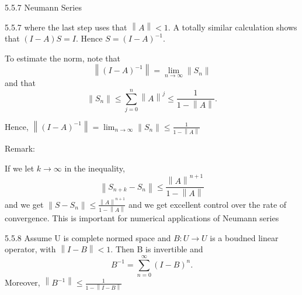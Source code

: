 \documentclass[a4paper,norsk]{article}
\renewcommand{\leq}{\leqslant}
\begin{document}
\begin{theorembox}{5.5.7 Neumann Series}{}
\begin{proofbox}{5.5.7}{}
        where the last step uses that $ \left\lVert A \right\rVert < 1 $. A totally similar calculation shows that $ \left( I-A \right) S = I $. Hence $ S = \left( I - A \right) ^{-1}  $.

        To estimate the norm, note that
        \[
            \left\lVert \left( I - A \right) ^{-1}  \right\rVert = \lim_{n \to \infty}  \left\lVert S_n \right\rVert 
        \]
        and that
        \[
            \left\lVert S_n \right\rVert \leq \sum_{j=0 }^{n} \left\lVert A \right\rVert ^{j} \leq \frac{ 1 }{ 1- \left\lVert A \right\rVert  }.
        \]

        Hence, $ \left\lVert \left( I - A \right) ^{-1}  \right\rVert  = \lim_{n \to \infty} \left\lVert S_n \right\rVert  \leq \frac{ 1 }{ 1- \left\lVert A \right\rVert  } $ 
    \end{proofbox}
\end{theorembox}


Remark:

If we let $k \to \infty $ in the inequality,
\[
    \left\lVert S_{n+k} - S_n \right\rVert \leq \frac{ \left\lVert A \right\rVert ^{n+1}  }{ 1 - \left\lVert A \right\rVert  }
\]
and we get $ \left\lVert S - S_n \right\rVert \leq \frac{ \left\lVert A \right\rVert ^{n+1}  }{ 1 - \left\lVert A \right\rVert  } $ 
and we get excellent control over the rate of convergence. This is important for numerical applications of Neumann series


\begin{corollarybox}{5.5.8}{}
Assume U is complete normed space and $ B : U \to U $ is a boudned linear operator, with $ \left\lVert I - B \right\rVert < 1 $. Then B is invertible and
\[
    B ^{-1} = \sum_{n=0}^{\infty} \left( I - B \right) ^{n}.
\]
Moreover, $ \left\lVert B ^{-1}  \right\rVert \leq \frac{ 1 }{ 1 - \left\lVert I - B \right\rVert  }  $ 
\end{corollarybox}
\end{document}

